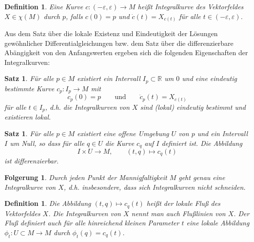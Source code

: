 \documentclass[12pt,a4paper]{article}
\def\R{\mathbb{R}}
\newtheorem{Satz}[Lemma]{Satz}
\newtheorem{Folgerung}[Lemma]{Folgerung}
\newtheorem{Definition}[Lemma]{Definition}
\begin{document}
\bigskip

\begin{Definition}
Eine Kurve $c: (-\varepsilon, \varepsilon)\rightarrow M$ hei\ss t {\em Integralkurve} des Vektorfeldes
$X\in \chi(M)$ durch $p$, falls $c(0)=p$ und $\dot c (t) = X_{c(t)}$ f\"ur alle $t\in (-\varepsilon, \varepsilon)$.
\end{Definition}

\bigskip

Aus dem Satz \"uber die lokale Existenz und Eindeutigkeit der L\"osungen gew\"ohnlicher Differentialgleichungen
bzw. dem Satz \"uber die differenzierbare Ab\"angigkeit von den Anfangswerten ergeben sich die folgenden
Eigenschaften der Integralkurven:

\begin{Satz}
F\"ur alle $p\in M$ existiert ein Intervall $I_p\subset \R$ um $0$
 und eine eindeutig bestimmte Kurve $c_p: I_p\rightarrow M$ mit
 $$
 c_p(0)= p \qquad \mbox{und} \qquad \dot c_p(t) = X_{c(t)}
 $$
 f\"ur alle $t\in I_p$, d.h. die Integralkurven von $X$ sind (lokal) eindeutig bestimmt und
 existieren lokal.
 \end{Satz}

 \medskip

 \begin{Satz}
 F\"ur alle $p\in M$ existiert eine offene Umgebung $U$ von $p$ und ein Intervall $I$ um Null, so dass
 f\"ur alle $q\in U$ die Kurve $c_q$ auf $I$ definiert ist.  Die Abbildung
 $$
 I \times U \rightarrow M, \qquad (t,q)\mapsto c_q(t)
 $$
 ist differenzierbar.
 \end{Satz}

 \bigskip

 \begin{Folgerung}
 Durch jeden Punkt der Mannigfaltigkeit $M$ geht genau eine Integralkurve von $X$, d.h. insbesondere,
 dass sich Integralkurven nicht schneiden.
 \end{Folgerung}

 \bigskip

 \begin{Definition}
 Die Abbildung $(t,q)\mapsto c_q(t)$ hei\ss t der {\em lokale Flu\ss{}} des Vektorfeldes $X$.
 Die Integralkurven von $X$ nennt man auch {\em Flu\ss linien} von $X$. Der Flu\ss{} definiert
 auch f\"ur alle hinreichend kleinen Parameter $t$ eine lokale Abbildung $\phi_t : U \subset M
 \rightarrow M$ durch  $\phi_t(q)= c_q(t)$.
 \end{Definition}

\bigskip
\end{document}
